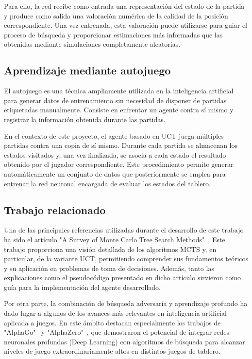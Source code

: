 \documentclass[conference,a4paper]{IEEEtran}
\begin{document}
Para ello, la red recibe como entrada una representación del estado de la partida y produce como salida una valoración numérica de la calidad de la posición correspondiente. 
Una vez entrenada, esta valoración puede utilizarse para guiar el proceso de búsqueda y proporcionar estimaciones más informadas que las obtenidas mediante simulaciones completamente aleatorias. 

\subsection{Aprendizaje mediante autojuego} 
El autojuego es una técnica ampliamente utilizada en la inteligencia artificial para generar datos de entrenamiento sin necesidad de disponer de partidas etiquetadas manualmente. 
Consiste en enfrentar un agente contra sí mismo y registrar la información obtenida durante las partidas. 

En el contexto de este proyecto, el agente basado en UCT juega múltiples partidas contra una copia de sí mismo. 
Durante cada partida se almacenan los estados visitados y, una vez finalizada, se asocia a cada estado el resultado obtenido por el jugador correspondiente. 
Este procedimiento permite generar automáticamente un conjunto de datos que posteriormente se emplea para entrenar la red neuronal encargada de evaluar los estados del tablero. 

\subsection{Trabajo relacionado} 

Una de las principales referencias utilizadas durante el desarrollo de este trabajo ha sido el artículo "A Survey of Monte Carlo Tree Search Methods"~\cite{b5}. 
Este trabajo proporciona una visión detallada de los algoritmos MCTS y, en particular, de la variante UCT, permitiendo comprender sus fundamentos teóricos y su aplicación en problemas de toma de decisiones. 
Además, tanto las explicaciones como el pseudocódigo presentado en dicho artículo sirvieron como guía para la implementación del agente desarrollado. 

Por otra parte, la combinación de búsqueda adversaria y aprendizaje profundo ha dado lugar a algunos de los avances más relevantes en inteligencia artificial aplicada a juegos. 
En este ámbito destacan especialmente los trabajos de "AlphaGo"~\cite{b6} y "AlphaZero"~\cite{b7}, que demostraron el potencial de integrar redes neuronales profundas (Deep Learning) con algoritmos de búsqueda para alcanzar niveles de juego extraordinariamente altos en distintos juegos de tablero. 
\end{document}
